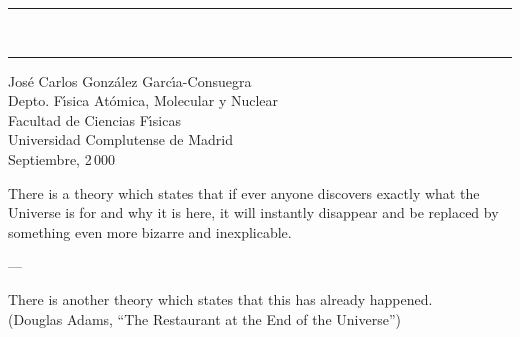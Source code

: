 \echapter

\thispagestyle{empty}  

\vspace*{2cm}
\begin{flushright}
  \rule{.7\linewidth}{1pt}\\
  \Large \mititulo
  \rule{.7\linewidth}{1pt}
\end{flushright}
\vspace*{6cm}
\begin{flushright}
  \large 
Jos{\'{e}} Carlos Gonz{\'{a}}lez Garc{\'{\i}}a-Consuegra\\[15 mm]
Depto. F{\'{\i}}sica At{\'{o}}mica, Molecular y Nuclear\\
Facultad de Ciencias F{\'{\i}}sicas\\
Universidad Complutense de Madrid\\[15 mm]
Septiembre, 2\,000
\end{flushright}

\echapter

\thispagestyle{empty}  

\vspace*{2cm} 
%
\hfill 
\parbox[b]{0.65\linewidth}{ 
%
\itshape
%
\raggedright
%
There is a theory which states that if ever anyone discovers exactly
what the Universe is for and why it is here, it will instantly
disappear and be replaced by something even more bizarre and
inexplicable. \\
%
\vspace{5pt}
\centerline{---}
\vspace{5pt}
%
There is another theory which states that this has already happened. \\
%
\vspace{15pt}
%
\upshape
%
\raggedleft
%
{\footnotesize (Douglas Adams, ``The Restaurant at the End of the
  Universe'')}
%
} 

\echapter

\endinput
%

